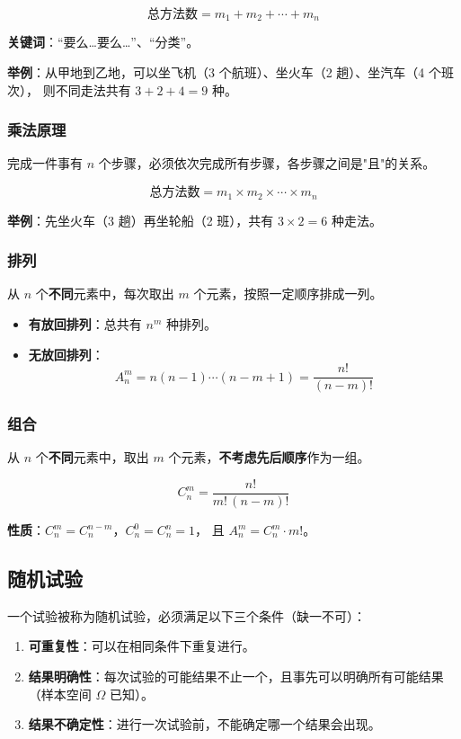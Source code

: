 \documentclass[12pt, a4paper]{article}
\begin{document}
\[
    \text{总方法数} = m_1 + m_2 + \cdots + m_n
\]

\textbf{关键词}：``要么…要么…''、``分类''。

\textbf{举例}：从甲地到乙地，可以坐飞机（3 个航班）、坐火车（2 趟）、坐汽车（4 个班次），
则不同走法共有 $3+2+4=9$ 种。

\subsubsection{乘法原理}

完成一件事有 $n$ 个步骤，必须依次完成所有步骤，各步骤之间是"且"的关系。

\[
    \text{总方法数} = m_1 \times m_2 \times \cdots \times m_n
\]

\textbf{举例}：先坐火车（3 趟）再坐轮船（2 班），共有 $3\times2=6$ 种走法。

\subsubsection{排列}

从 $n$ 个\textbf{不同}元素中，每次取出 $m$ 个元素，按照一定顺序排成一列。

\begin{itemize}
    \item \textbf{有放回排列}：总共有 $n^m$ 种排列。
    \item \textbf{无放回排列}：
          \[
              A_n^m = n(n-1)\cdots(n-m+1) = \frac{n!}{(n-m)!}
          \]
\end{itemize}

\subsubsection{组合}

从 $n$ 个\textbf{不同}元素中，取出 $m$ 个元素，\textbf{不考虑先后顺序}作为一组。

\[
    \boxed{C_n^m = \frac{n!}{m!\,(n-m)!}}
\]

\textbf{性质}：$C_n^m = C_n^{n-m}$，$C_n^0 = C_n^n = 1$，
且 $A_n^m = C_n^m \cdot m!$。

\subsection{随机试验}

一个试验被称为随机试验，必须满足以下三个条件（缺一不可）：

\begin{enumerate}
    \item \textbf{可重复性}：可以在相同条件下重复进行。
    \item \textbf{结果明确性}：每次试验的可能结果不止一个，且事先可以明确所有可能结果
          （样本空间 $\Omega$ 已知）。
    \item \textbf{结果不确定性}：进行一次试验前，不能确定哪一个结果会出现。
\end{enumerate}
\end{document}

